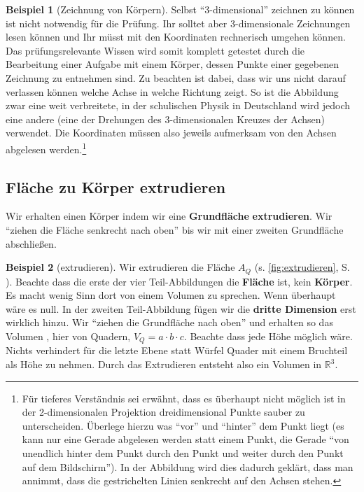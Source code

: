 \documentclass[a4paper]{book}%
\theoremstyle{definition}
\newtheorem{beispiel}{Beispiel}
\begin{document}
\begin{beispiel}[Zeichnung von Körpern]
Selbst \enquote{3-dimensional} zeichnen zu können ist nicht notwendig für die Prüfung. Ihr solltet aber 3-dimensionale Zeichnungen lesen können und Ihr müsst mit den Koordinaten rechnerisch umgehen können. Das prüfungsrelevante Wissen wird somit komplett getestet durch die Bearbeitung einer Aufgabe mit einem Körper, dessen Punkte einer gegebenen Zeichnung zu entnehmen sind. Zu beachten ist dabei, dass wir uns nicht darauf verlassen können welche Achse in welche Richtung zeigt. So ist die Abbildung zwar eine weit verbreitete, in der schulischen Physik in Deutschland wird jedoch eine andere (eine der Drehungen des 3-dimensionalen Kreuzes der Achsen) verwendet. Die Koordinaten müssen also jeweils aufmerksam von den Achsen abgelesen werden.\footnote{Für tieferes Verständnis sei erwähnt, dass es überhaupt nicht möglich ist in der 2-dimensionalen Projektion dreidimensional Punkte sauber zu unterscheiden. Überlege hierzu was \enquote{vor} und \enquote{hinter} dem Punkt liegt (es kann nur eine Gerade abgelesen werden statt einem Punkt, die Gerade \enquote{von unendlich hinter dem Punkt durch den Punkt und weiter durch den Punkt auf dem Bildschirm}). In der Abbildung wird dies dadurch geklärt, dass man annimmt, dass die gestrichelten Linien senkrecht auf den Achsen stehen.}
\end{beispiel}


\subsection{Fläche zu Körper extrudieren}\label{Extrudieren}

Wir erhalten einen Körper indem wir eine \textbf{Grundfläche} \textbf{extrudieren}. Wir \enquote{ziehen die Fläche senkrecht nach oben} bis wir mit einer zweiten Grundfläche abschließen.

\begin{beispiel}[extrudieren]
    Wir extrudieren die Fläche $A_Q$ (s. \ref{fig:extrudieren}, S. \pageref{fig:extrudieren}). Beachte dass die erste der vier Teil-Abbildungen die \textbf{Fläche} ist, kein \textbf{Körper}. Es macht wenig Sinn dort von einem Volumen zu sprechen. Wenn überhaupt wäre es null. In der zweiten Teil-Abbildung fügen wir die \textbf{dritte Dimension} erst wirklich hinzu. Wir \enquote{ziehen die Grundfläche nach oben} und erhalten so das Volumen , hier von Quadern, $V_Q = a \cdot b \cdot c$. Beachte dass jede Höhe möglich wäre. Nichts verhindert für die letzte Ebene statt Würfel Quader mit einem Bruchteil als Höhe zu nehmen. Durch das Extrudieren entsteht also ein Volumen in $\mathbb{R}^3$.
\end{beispiel}
\end{document}
